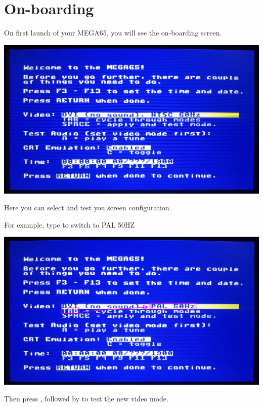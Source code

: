 \section{On-boarding}

On first launch of your MEGA65, you will see the on-boarding screen.

\begin{center}
  \includegraphics[width=\linewidth]{images/img011_final_boot_01.jpg}
\end{center}

Here you can select and test you screen configuration.

For example, type  to switch to PAL 50HZ

\begin{center}
  \includegraphics[width=\linewidth]{images/img011_final_boot_02.png}
\end{center}

Then press  , followed by  to test the new video mode.

